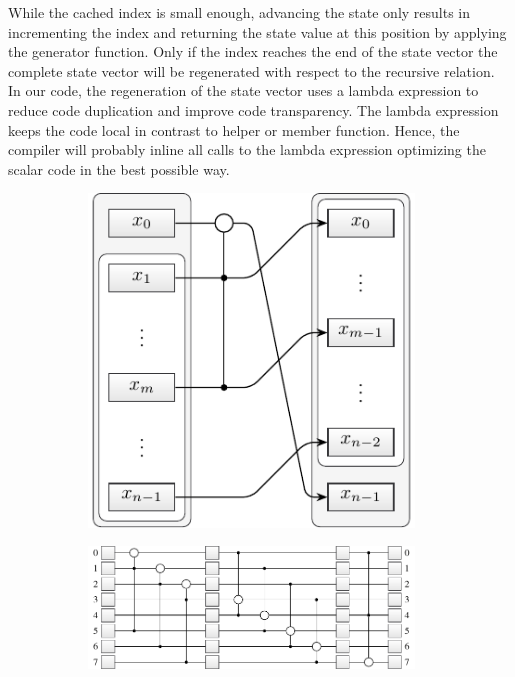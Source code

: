 \documentclass{stdlocal}
\begin{document}
    While the cached index is small enough, advancing the state only results in incrementing the index and returning the state value at this position by applying the generator function.
    Only if the index reaches the end of the state vector the complete state vector will be regenerated with respect to the recursive relation.
    In our code, the regeneration of the state vector uses a lambda expression to reduce code duplication and improve code transparency.
    The lambda expression keeps the code local in contrast to helper or member function.
    Hence, the compiler will probably inline all calls to the lambda expression optimizing the scalar code in the best possible way.

    \begin{figure}
      \center
      \begin{subfigure}[b]{0.25\textwidth}
        \center
        \includegraphics[width=0.95\textwidth]{figures/mt19937_transition_short.pdf}
      \end{subfigure}
      \begin{subfigure}[b]{0.73\textwidth}
        \center
        \includegraphics[width=0.95\textwidth]{figures/mt19937_loop_scheme.pdf}

\end{subfigure}
\end{figure}
\end{document}
